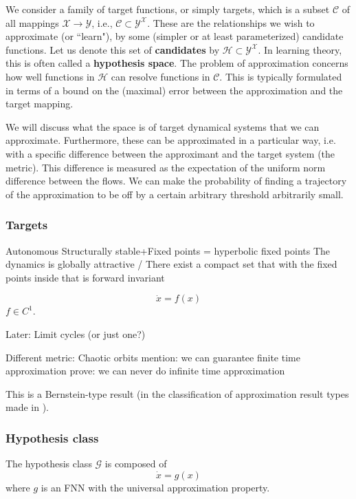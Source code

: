 \documentclass{article}
\theoremstyle{definition}
\theoremstyle{remark}
\begin{document}
We consider a family of target functions, or simply targets, which is a subset \(\mathcal{C} \) of all mappings \( \mathcal{X} \rightarrow \mathcal{Y} \), i.e., \( \mathcal{C} \subset \mathcal{Y}^\mathcal{X} \). 
These are the relationships we wish to approximate (or ``learn"), by some (simpler or at least parameterized) candidate functions.
Let us denote this set of \textbf{candidates} by \( \mathcal{H} \subset \mathcal{Y}^\mathcal{X} \).
In learning theory, this is often called a \textbf{hypothesis space}.
The problem of approximation concerns how well functions in \( \mathcal{H} \) can resolve functions in \( \mathcal{C} \).
This is typically formulated in terms of a bound on the (maximal) error between the approximation and the target mapping.

We will discuss what the space is of target dynamical systems that we can approximate.
Furthermore, these can be approximated in a particular way, i.e. with a specific difference between the approximant and the target system (the metric).
This difference is measured as the expectation of the uniform norm difference between the flows. 
We can make the probability of finding a trajectory of the approximation to be off by a certain arbitrary threshold arbitrarily small. 


\subsubsection{Targets}
Autonomous
Structurally stable+Fixed points = hyperbolic fixed points
The dynamics is globally attractive / There exist a compact set that with the fixed points inside that is forward invariant 

\begin{equation}
\dot x = f(x)
\end{equation}
$f\in C^1$.



Later: Limit cycles (or just one?)



Different metric: Chaotic orbits
mention: we can guarantee finite time approximation
prove: we can never do infinite time approximation 


This is a Bernstein-type result (in the classification of approximation result types made in \citep{jiang2023brief}).


\subsubsection{Hypothesis class}
The hypothesis class $\mathcal{G}$ is composed of
\begin{equation}
\dot x = g(x) 
\end{equation}
where $g$ is an FNN with the universal approximation property.
\end{document}
